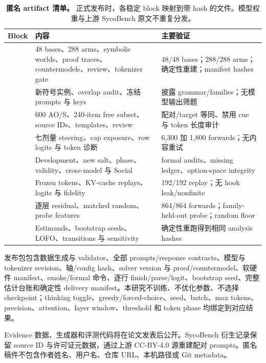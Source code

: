 \documentclass[UTF8,letterpaper,10pt,twocolumn]{ctexart}
\begin{document}
\begin{table}[t]
\centering
\scriptsize
\setlength{\tabcolsep}{3pt}
\renewcommand{\arraystretch}{1.12}
\begin{tabularx}{\textwidth}{@{}L{3.2cm}YY@{}}
\toprule
Block & 内容 & 主要验证 \\
\midrule
{} & 48 bases、288 arms、symbolic worlds、proof traces、countermodels、review、tokenizer gate & 48/48 bases；288/288 arms；确定性重建；manifest hashes \\
 & 新符号实例、overlap audit、冻结 prompts 与 keys & 披露 grammar/families；无模型输出筛题 \\
 & 600 AO/S、240-item free subset、source IDs、templates、review & 配对/target 等同、禁用 cue 与 token 长度审计 \\
 & 七剂量 steering、cap exposure、row logits 与 token 诊断 & 6,300 加 1,800 forwards；无内容重试 \\
 & Development、new salt、phase、validity、cross-model 与 Social & formal audits、missing ledger、option-space integrity \\
 & Frozen tokens、KV-cache replays、logits 与 fidelity & 192/192 replay；无 hook leak/nonfinite \\
 & 逐层 residual、matched random、probe features & 864/864 forwards；family-held-out probe；random floor \\
 & Estimands、bootstrap seeds、LOFO、transitions 与 sensitivity & 确定性重跑得到相同 analysis hashes \\
\bottomrule
\end{tabularx}
\caption{\textbf{匿名 artifact 清单。} 正式发布时，各稳定 block 映射到带 hash 的文件。模型权重与上游 SycoBench 原文不重复分发。}
\label{tab:supp-artifacts-zh}
\end{table}

发布包包含数据生成与 validator、全部 prompts/response contracts、模型与 tokenizer revision、轴/config hash、solver version 与 proof/countermodel、软硬件 manifest、smoke/formal 命令、逐行 finish/parse/logit、bootstrap seed、完整估计台账和确定性 delivery manifest。本研究不训练、不优化参数、不选择 checkpoint；thinking toggle、greedy/forced-choice、seed、batch、max tokens、precision、attention、layer window、threshold 和 token phase 均绑定到对应结果。

Evidence 数据、生成器和评测代码将在论文发表后公开。SycoBench 衍生记录保留 source ID 与许可证元数据，通过上游 CC-BY-4.0 源重建配对 prompts。匿名稿件不包含作者姓名、用户名、仓库 URL、本机路径或 Git metadata。



\end{document}
